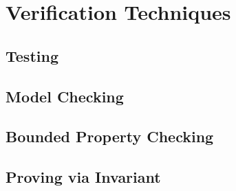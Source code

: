 
\chapter{Verification Techniques}
\section{Testing}
\section{Model Checking}
\section{Bounded Property Checking}
\section{Proving via Invariant}